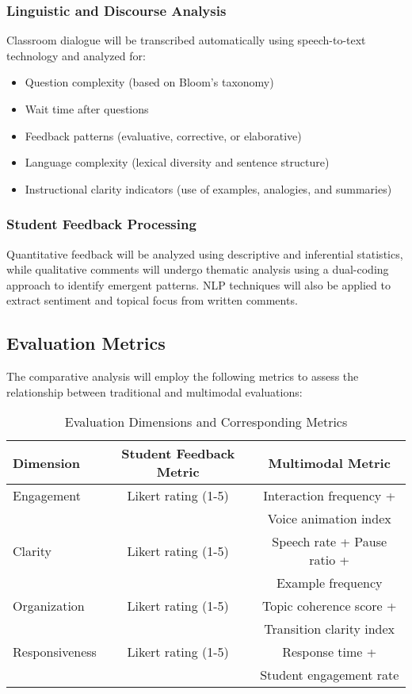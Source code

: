 \subsubsection{Linguistic and Discourse Analysis}
Classroom dialogue will be transcribed automatically using speech-to-text technology and analyzed for:
\begin{itemize}
    \item Question complexity (based on Bloom's taxonomy)
    \item Wait time after questions
    \item Feedback patterns (evaluative, corrective, or elaborative)
    \item Language complexity (lexical diversity and sentence structure)
    \item Instructional clarity indicators (use of examples, analogies, and summaries)
\end{itemize}

\subsubsection{Student Feedback Processing}
Quantitative feedback will be analyzed using descriptive and inferential statistics, while qualitative comments will undergo thematic analysis using a dual-coding approach to identify emergent patterns. NLP techniques will also be applied to extract sentiment and topical focus from written comments.

\subsection{Evaluation Metrics}
The comparative analysis will employ the following metrics to assess the relationship between traditional and multimodal evaluations:

\begin{table}[t]
    \centering
    \normalsize
    \caption{Evaluation Dimensions and Corresponding Metrics}
    \label{tab:metrics}
    \begin{tabular}{lcc}
        \toprule
        \textbf{Dimension} & \textbf{Student Feedback Metric} & \textbf{Multimodal Metric} \\
        \midrule
        Engagement & Likert rating (1-5) & Interaction frequency + \\
         & & Voice animation index \\
        \midrule
        Clarity & Likert rating (1-5) & Speech rate + Pause ratio + \\
         & & Example frequency \\
        \midrule
        Organization & Likert rating (1-5) & Topic coherence score + \\
         & & Transition clarity index \\
        \midrule
        Responsiveness & Likert rating (1-5) & Response time + \\
         & & Student engagement rate \\
        \bottomrule
    \end{tabular}
\end{table}


